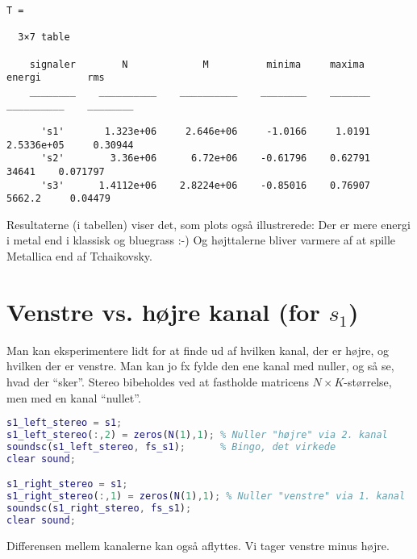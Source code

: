 \documentclass[a4paper]{report}
\begin{document}
        \color{lightgray} \begin{verbatim}
T =

  3×7 table

    signaler        N             M          minima     maxima       energi        rms   
    ________    __________    __________    ________    _______    __________    ________

      's1'       1.323e+06     2.646e+06     -1.0166     1.0191    2.5336e+05     0.30944
      's2'        3.36e+06      6.72e+06    -0.61796    0.62791         34641    0.071797
      's3'      1.4112e+06    2.8224e+06    -0.85016    0.76907        5662.2     0.04479

\end{verbatim} \color{black}
    \begin{par}
Resultaterne (i tabellen) viser det, som plots også illustrerede: Der er mere energi i metal end i klassisk og bluegrass :-) Og højttalerne bliver varmere af at spille Metallica end af Tchaikovsky.
\end{par} 



\section{Venstre vs. højre kanal (for $s_1$)}

        \begin{par}

Man kan eksperimentere lidt for at finde ud af hvilken kanal, der er
højre, og hvilken der er venstre.
Man kan jo fx fylde den ene kanal med nuller, og så se, hvad der ``sker''.
Stereo bibeholdes ved at fastholde matricens $N\times K$-størrelse, men
med en kanal ``nullet''.\\

\end{par} 

\begin{lstlisting}[language=Matlab, style=Matlab-editor]
s1_left_stereo = s1;
s1_left_stereo(:,2) = zeros(N(1),1); % Nuller "højre" via 2. kanal
soundsc(s1_left_stereo, fs_s1);      % Bingo, det virkede
clear sound;

s1_right_stereo = s1;
s1_right_stereo(:,1) = zeros(N(1),1); % Nuller "venstre" via 1. kanal
soundsc(s1_right_stereo, fs_s1);
clear sound;
\end{lstlisting}
\begin{par}

Differensen mellem kanalerne kan også aflyttes.
Vi tager venstre minus højre.\\

\end{par} 
\end{document}
